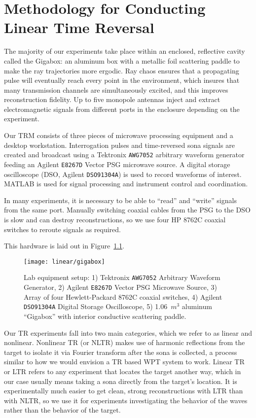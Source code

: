 \chapter{Methodology for Conducting Linear Time Reversal}
\label{ch:linear-meth}

The majority of our experiments take place within an enclosed, reflective cavity called the Gigabox: an aluminum box with a metallic foil scattering paddle to make the ray trajectories more ergodic. Ray chaos ensures that a propagating pulse will eventually reach every point in the environment, which insures that many transmission channels are simultaneously excited, and this improves reconstruction fidelity. Up to five monopole antennas inject and extract electromagnetic signals from different ports in the enclosure depending on the experiment.

Our TRM consists of three pieces of microwave processing equipment and a desktop workstation. Interrogation pulses and time-reversed sona signals are created and broadcast using a Tektronix \texttt{AWG7052} arbitrary waveform generator feeding an Agilent \texttt{E8267D} Vector PSG microwave source. A digital storage oscilloscope (DSO, Agilent \texttt{DSO91304A}) is used to record waveforms of interest. MATLAB is used for signal processing and instrument control and coordination.

In many experiments, it is necessary to be able to “read” and “write” signals from the same port. Manually switching coaxial cables from the PSG to the DSO is slow and can destroy reconstructions, so we use four HP 8762C coaxial switches to reroute signals as required.

This hardware is laid out in Figure~\ref{fig:linear-gigabox}.

\begin{figure}[h!]
\centering
\texttt{[image: linear/gigabox]}
    \caption[Lab equipment setup]{Lab equipment setup: 1) Tektronix \texttt{AWG7052} Arbitrary Waveform Generator, 2) Agilent \texttt{E8267D} Vector PSG Microwave Source, 3) Array of four Hewlett-Packard 8762C coaxial switches, 4) Agilent \texttt{DSO91304A} Digital Storage Oscilloscope, 5) 1.06~$m^3$ aluminum ``Gigabox'' with interior conductive scattering paddle.}
    \label{fig:linear-gigabox}
\end{figure}

Our TR experiments fall into two main categories, which we refer to as linear and nonlinear. Nonlinear TR (or NLTR) makes use of harmonic reflections from the target to isolate it via Fourier transform after the sona is collected, a process similar to how we would envision a TR based WPT system to work. Linear TR or LTR refers to any experiment that locates the target another way, which in our case usually means taking a sona directly from the target’s location. It is experimentally much easier to get clean, strong reconstructions with LTR than with NLTR, so we use it for experiments investigating the behavior of the waves rather than the behavior of the target.

